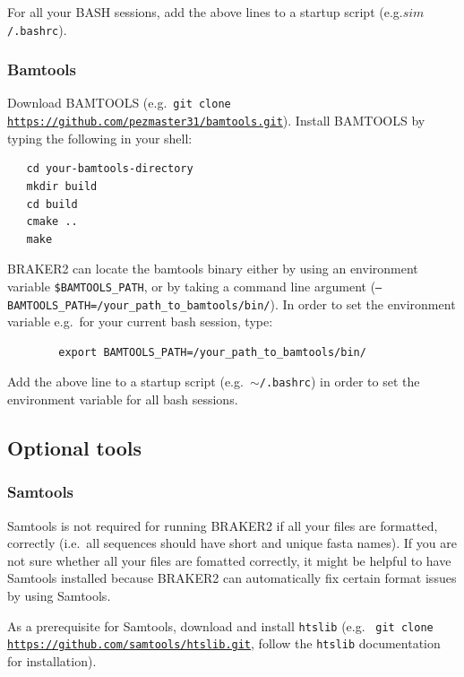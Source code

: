 \documentclass[a4paper,10pt]{report}
\begin{document}
    For all your BASH sessions, add the above lines to a startup script (e.g.\texttt{$sim$/.bashrc}).

   

\subsubsection{Bamtools}

Download BAMTOOLS (e.g.~\texttt{git clone \url{https://github.com/pezmaster31/bamtools.git}}). Install BAMTOOLS by typing the following in your shell:\\

 \begin{verbatim}
   cd your-bamtools-directory
   mkdir build
   cd build
   cmake ..
   make
 \end{verbatim}

 BRAKER2 can locate the bamtools binary either by using an environment variable \texttt{\$BAMTOOLS\_PATH}, or by taking a command line argument (\texttt{--BAMTOOLS\_PATH=/your\_path\_to\_bamtools/bin/}). In order to set the environment variable e.g.~for your current bash session, type:

    \begin{verbatim}
        export BAMTOOLS_PATH=/your_path_to_bamtools/bin/ 
    \end{verbatim} 

    Add the above line to a startup script (e.g.~\texttt{$\sim$/.bashrc}) in order to set the environment variable for all bash sessions.
    
\subsection{Optional tools}

\subsubsection{Samtools}

Samtools is not required for running BRAKER2 if all your files are formatted, correctly (i.e.~all sequences should have short and unique fasta names). If you are not sure
      whether all your files are fomatted correctly, it might be helpful to have Samtools
      installed because BRAKER2 can automatically fix certain format issues by using Samtools. 

      As a prerequisite for Samtools, download and install \texttt{htslib} (e.g.~ 
      \texttt{git clone \url{https://github.com/samtools/htslib.git}}, follow the \texttt{htslib} documentation for 
      installation).
\end{document}
